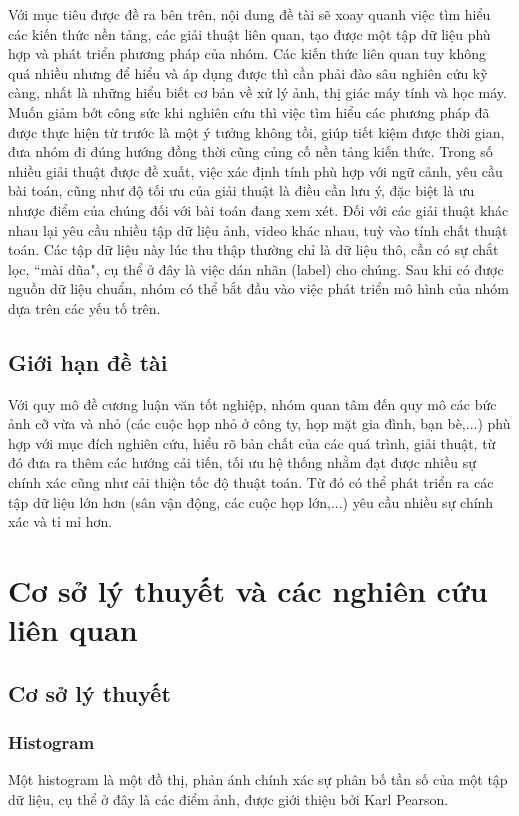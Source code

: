 \documentclass[12pt,a4paper]{article}
\begin{document}
Với mục tiêu được đề ra bên trên, nội dung đề tài sẽ xoay quanh việc tìm hiểu các kiến thức nền tảng, các giải thuật liên quan, tạo được một tập dữ liệu phù hợp và phát triển phương pháp của nhóm. Các kiến thức liên quan tuy không quá nhiều nhưng để hiểu và áp dụng được thì cần phải đào sâu nghiên cứu kỹ càng, nhất là những hiểu biết cơ bản về xử lý ảnh, thị giác máy tính và học máy. Muốn giảm bớt công sức khi nghiên cứu thì việc tìm hiểu các phương pháp đã được thực hiện từ trước là một ý tưởng không tồi, giúp tiết kiệm được thời gian, đưa nhóm đi đúng hướng đồng thời cũng củng cố nền tảng kiến thức. Trong số nhiều giải thuật được đề xuất, việc xác định tính phù hợp với ngữ cảnh, yêu cầu bài toán, cũng như độ tối ưu của giải thuật là điều cần lưu ý, đặc biệt là ưu nhược điểm của chúng đối với bài toán đang xem xét. Đối với các giải thuật khác nhau lại yêu cầu nhiều tập dữ liệu ảnh, video khác nhau, tuỳ vào tính chất thuật toán. Các tập dữ liệu này lúc thu thập thường chỉ là dữ liệu thô, cần có sự chắt lọc, “mài dũa", cụ thể ở đây là việc dán nhãn (label) cho chúng. Sau khi có được nguồn dữ liệu chuẩn, nhóm có thể bắt đầu vào việc phát triển mô hình của nhóm dựa trên các yếu tố trên.

		\subsection{Giới hạn đề tài}
Với quy mô đề cương luận văn tốt nghiệp, nhóm quan tâm đến quy mô các bức ảnh cỡ vừa và nhỏ (các cuộc họp nhỏ ở công ty, họp mặt gia đình, bạn bè,...) phù hợp với mục đích nghiên cứu, hiểu rõ bản chất của các quá trình, giải thuật, từ đó đưa ra thêm các hướng cải tiến, tối ưu hệ thống nhằm đạt được nhiều sự chính xác cũng như cải thiện tốc độ thuật toán. Từ đó có thể phát triển ra các tập dữ liệu lớn hơn (sân vận động, các cuộc họp lớn,...) yêu cầu nhiều sự chính xác và tỉ mỉ hơn.
		\section{Cơ sở lý thuyết và các nghiên cứu liên quan}
		\subsection{Cơ sở lý thuyết}
		    \subsubsection{Histogram}

		    Một histogram là một đồ thị, phản ánh chính xác sự phân bố tần số của một tập dữ liệu, cụ thể ở đây là các điểm ảnh, được giới thiệu bởi Karl Pearson. \\
\end{document}
